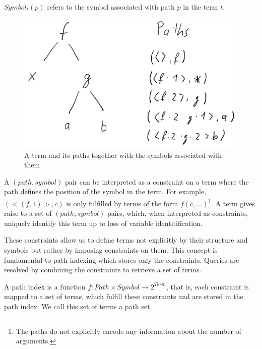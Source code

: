 \begin{defn}
  $Symbol_{t}(p)$ refers to the symbol associated with path $p$ in the term $t$.
\end{defn}

\begin{figure}[h]
\centering
\includegraphics[scale=0.25]{figures/term_path.png}
\caption{A term and its paths together with the symbols associated with them}
\label{termpaths}
\end{figure}

A $(path, symbol)$ pair can be interpreted as a constraint on a term where the path defines the position of the symbol in the term. For example, $(<(f,1)>, c)$ is only fulfilled by terms of the form $f(c,...)$\footnote{The paths do not explicitly encode any information about the number of arguments.}. A term gives raise to a set of $(path, symbol)$ pairs, which, when interpreted as constraints, uniquely identify this term up to loss of variable identitification.

These constraints allow us to define terms not explicitly by their structure and symbols but rather by imposing constraints on them. This concept is fundamental to path indexing which stores only the constraints. Queries are resolved by combining the constraints to retrieve a set of terms.

\begin{defn}
  A path index is a function $f: Path \times Symbol \longrightarrow 2^{Term}$, that is, each constraint is mapped to a set of terms, which fulfill these constraints and are stored in the path index. We call this set of terms a path set.
\end{defn}

